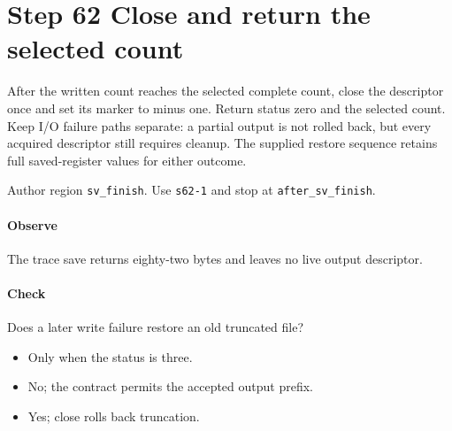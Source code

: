 \section{Step 62 Close and return the selected count}\label{pcm-wav-s62}
After the written count reaches the selected complete count, close the descriptor once and set its marker to minus one. Return status zero and the selected count. Keep I/O failure paths separate: a partial output is not rolled back, but every acquired descriptor still requires cleanup. The supplied restore sequence retains full saved-register values for either outcome.

Author region \texttt{sv\_finish}. Use \texttt{s62-1} and stop at \texttt{after\_sv\_finish}.

\paragraph{Observe} The trace save returns eighty-two bytes and leaves no live output descriptor.

\paragraph{Check} Does a later write failure restore an old truncated file?
\begin{itemize}
\item[A.] Only when the status is three.
\item[B.] No; the contract permits the accepted output prefix.
\item[C.] Yes; close rolls back truncation.
\end{itemize}
